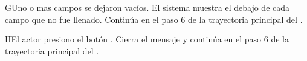 

\begin{UCtrayectoriaA}{G}{Uno o mas campos se dejaron vacíos.}
	\UCpaso El sistema muestra el  debajo de cada campo que no fue llenado. 
	\UCpaso	Continúa en el paso 6 de la trayectoria principal del .
\end{UCtrayectoriaA}

	\begin{UCtrayectoriaA}{H}{El actor presiono el botón .}
	\UCpaso Cierra el mensaje y continúa en el paso 6 de la trayectoria principal del .	
\end{UCtrayectoriaA}